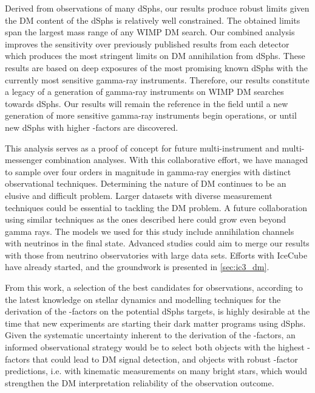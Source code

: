 Derived from observations of many dSphs, our results produce robust limits given the DM content of the dSphs is relatively well constrained.
The obtained limits span the largest mass range of any WIMP DM search.
Our combined analysis improves the sensitivity over previously published results from each detector which produces the most stringent limits on DM annihilation from dSphs.
These results are based on deep exposures of the most promising known dSphs with the currently most sensitive gamma-ray instruments.
Therefore, our results constitute a legacy of a generation of gamma-ray instruments on WIMP DM searches towards dSphs.
Our results will remain the reference in the field until a new generation of more sensitive gamma-ray instruments begin operations, or until new dSphs with higher \J-factors are discovered.

This analysis serves as a proof of concept for future multi-instrument and multi-messenger combination analyses.
With this collaborative effort, we have managed to sample over four orders in magnitude in gamma-ray energies with distinct observational techniques.
Determining the nature of DM continues to be an elusive and difficult problem.
Larger datasets with diverse measurement techniques could be essential to tackling the DM problem.
A future collaboration using similar techniques as the ones described here could grow even beyond gamma rays.
The models we used for this study include annihilation channels with neutrinos in the final state.
Advanced studies could aim to merge our results with those from neutrino observatories with large data sets.
Efforts with IceCube have already started, and the groundwork is presented in \cref{sec:ic3_dm}.

From this work, a selection of the best candidates for observations, according to the latest knowledge on stellar dynamics and modelling techniques for the derivation of the \J-factors on the potential dSphs targets, is highly desirable at the time that new experiments are starting their dark matter programs using dSphs.
Given the systematic uncertainty inherent to the derivation of the \J-factors,
an informed observational strategy would be to select both objects with the highest \J-factors that could lead to DM signal detection, and objects with robust \J-factor predictions, i.e. with kinematic measurements on many bright stars, which would strengthen the DM interpretation reliability of the observation outcome.

